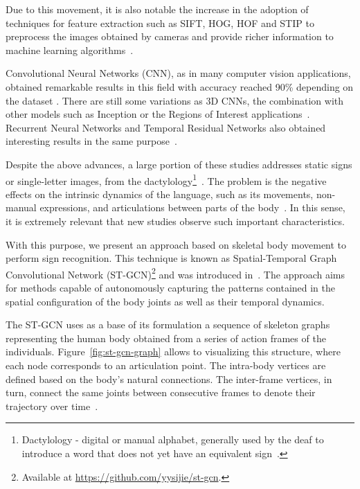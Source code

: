 Due to this movement, it is also notable the increase in the adoption of techniques for feature extraction such as SIFT, HOG, HOF and STIP to preprocess the images obtained by cameras and provide richer information to machine learning algorithms~\cite{laptev-2008,lim-2016}.

Convolutional Neural Networks (CNN), as in many computer vision applications, obtained remarkable results in this field with accuracy reached 90\% depending on the dataset \cite{taskiran-2018,rao-2018}. There are still some variations as 3D CNNs, the combination with other models such as Inception or the Regions of Interest applications~\cite{elbadawy-2017,das-2018,sajanraj-2018}. Recurrent Neural Networks and Temporal Residual Networks also obtained interesting results in the same purpose~\cite{konstantinidis-2018,pigou-2017}.

Despite the above advances, a large portion of these studies addresses static signs or single-letter images, from the dactylology\footnote{Dactylology - digital or manual alphabet, generally used by the deaf to introduce a word that does not yet have an equivalent sign~\cite{pereira-choi-2011}.
}~\cite{taskiran-2018,das-2018}. The problem is the negative effects on the intrinsic dynamics of the language, such as its movements, non-manual expressions, and articulations between parts of the body~\cite{quadros-2004}. In this sense, it is extremely relevant that new studies observe such important characteristics.

With this purpose, we present an approach based on skeletal body movement to perform sign recognition. This technique is known as Spatial-Temporal Graph Convolutional Network (ST-GCN)\footnote {Available at \url{https://github.com/yysijie/st-gcn}.} and was introduced in~\cite{st-gcn-2018}. The approach aims for methods capable of autonomously capturing the patterns contained in the spatial configuration of the body joints as well as their temporal dynamics. %

The ST-GCN uses as a base of its formulation a sequence of skeleton graphs representing the human body obtained from a series of action frames of the individuals. Figure~\ref{fig:st-gcn-graph} allows to visualizing this structure, where each node corresponds to an articulation point. The intra-body vertices are defined based on the body's natural connections. The inter-frame vertices, in turn, connect the same joints between consecutive frames to denote their trajectory over time~\cite{st-gcn-2018}. %
    

